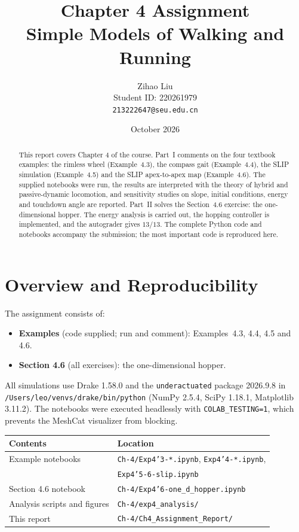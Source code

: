 \documentclass[11pt]{article}
\title{\textbf{Chapter 4 Assignment}\\[4pt]
Simple Models of Walking and Running}
\author{Zihao Liu\\[2pt]
Student ID: 220261979\\[2pt]
\texttt{213222647@seu.edu.cn}}
\date{October 2026}
\begin{document}
\maketitle

\begin{abstract}
This report covers Chapter 4 of the course.  Part~I comments on the four
textbook examples: the rimless wheel (Example~4.3), the compass gait
(Example~4.4), the SLIP simulation (Example~4.5) and the SLIP apex-to-apex map
(Example~4.6).  The supplied notebooks were run, the results are interpreted
with the theory of hybrid and passive-dynamic locomotion, and sensitivity
studies on slope, initial conditions, energy and touchdown angle are reported.
Part~II solves the Section~4.6 exercise: the one-dimensional hopper.  The
energy analysis is carried out, the hopping controller is implemented, and the
autograder gives $13/13$.  The complete Python code and notebooks accompany the
submission; the most important code is reproduced here.
\end{abstract}

\tableofcontents
\newpage

\section{Overview and Reproducibility}

The assignment consists of:
\begin{itemize}[leftmargin=1.5em]
  \item \textbf{Examples} (code supplied; run and comment): Examples~4.3,
        4.4, 4.5 and 4.6.
  \item \textbf{Section 4.6} (all exercises): the one-dimensional hopper.
\end{itemize}

\begin{sloppypar}
All simulations use Drake 1.58.0 and the \texttt{underactuated} package
2026.9.8 in \texttt{/Users/leo/venvs/drake/bin/python} (NumPy 2.5.4,
SciPy 1.18.1, Matplotlib 3.11.2).  The notebooks were executed headlessly with
\texttt{COLAB\_TESTING=1}, which prevents the MeshCat visualizer from blocking.
\end{sloppypar}

\begin{center}
\begin{tabular}{ll}
\toprule
Contents & Location \\
\midrule
Example notebooks & \texttt{Ch-4/Exp4'3-*.ipynb}, \texttt{Exp4'4-*.ipynb}, \\
 & \texttt{Exp4'5-6-slip.ipynb} \\
Section 4.6 notebook & \texttt{Ch-4/Exp4'6-one\_d\_hopper.ipynb} \\
Analysis scripts and figures & \texttt{Ch-4/exp4\_analysis/} \\
This report & \texttt{Ch-4/Ch4\_Assignment\_Report/} \\
\bottomrule
\end{tabular}
\end{center}
\end{document}
